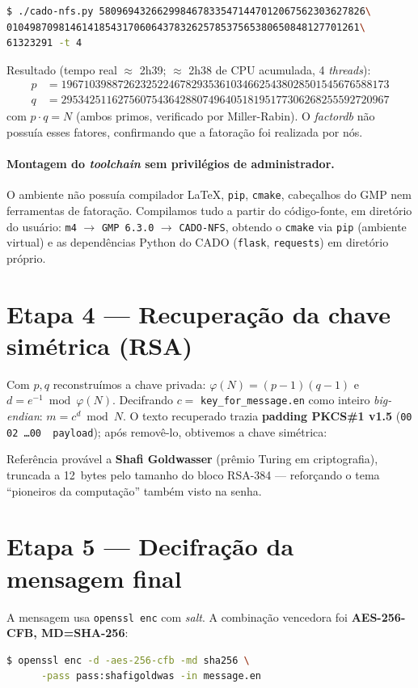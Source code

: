 \documentclass[11pt,a4paper]{article}
\begin{document}
\begin{lstlisting}[style=plain,language=bash]
$ ./cado-nfs.py 5809694326629984678335471447012067562303627826\
0104987098146141854317060643783262578537565380650848127701261\
61323291 -t 4
\end{lstlisting}

\noindent Resultado (tempo real $\approx$ 2h39; $\approx$ 2h38 de CPU acumulada, 4 \emph{threads}):
\begin{align*}
p &= 1967103988726232522467829353610346625438028501545676588173\\
q &= 2953425116275607543642880749640518195177306268255592720967
\end{align*}
com $p\cdot q = N$ (ambos primos, verificado por Miller-Rabin). O \emph{factordb} não possuía esses
fatores, confirmando que a fatoração foi realizada por nós.

\paragraph{Montagem do \emph{toolchain} sem privilégios de administrador.} O ambiente não possuía
compilador LaTeX, \texttt{pip}, \texttt{cmake}, cabeçalhos do GMP nem ferramentas de fatoração.
Compilamos tudo a partir do código-fonte, em diretório do usuário: \texttt{m4} $\rightarrow$
\texttt{GMP 6.3.0} $\rightarrow$ \texttt{CADO-NFS}, obtendo o \texttt{cmake} via \texttt{pip} (ambiente
virtual) e as dependências Python do CADO (\texttt{flask}, \texttt{requests}) em diretório próprio.

\section{Etapa 4 --- Recuperação da chave simétrica (RSA)}
Com $p,q$ reconstruímos a chave privada: $\varphi(N)=(p-1)(q-1)$ e $d=e^{-1}\bmod\varphi(N)$.
Decifrando $c=$ \texttt{key\_for\_message.en} como inteiro \emph{big-endian}: $m=c^{d}\bmod N$.
O texto recuperado trazia \textbf{padding PKCS\#1 v1.5} (\texttt{00 02 \dots 00 \textbar\ payload}); após
removê-lo, obtivemos a chave simétrica:
\begin{center}\fbox{\large\ttfamily chave da mensagem = shafigoldwas}\end{center}
Referência provável a \textbf{Shafi Goldwasser} (prêmio Turing em criptografia), truncada a 12~bytes
pelo tamanho do bloco RSA-384 --- reforçando o tema ``pioneiros da computação'' também visto na senha.

\section{Etapa 5 --- Decifração da mensagem final}
A mensagem usa \texttt{openssl enc} com \emph{salt}. A combinação vencedora foi
\textbf{AES-256-CFB, MD=SHA-256}:
\begin{lstlisting}[style=plain,language=bash]
$ openssl enc -d -aes-256-cfb -md sha256 \
      -pass pass:shafigoldwas -in message.en
\end{lstlisting}
\end{document}
